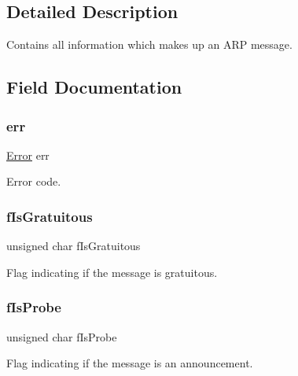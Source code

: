 \subsection{Detailed Description}
Contains all information which makes up an A\+RP message. 

\subsection{Field Documentation}
\mbox{\label{struct_a_r_pmessage___a9078d3b85b5a7c46fc5c80899bd3b6b3}} 
\subsubsection{\texorpdfstring{err}{err}}
{\footnotesize\ttfamily \mbox{\hyperlink{group__error_gada9d6bcf34dabaf048e197cb7b69fa6a}{Error}} err}



Error code. 

\mbox{\label{struct_a_r_pmessage___abf4812a73fd577ace2b9fc876deb3a41}} 
\subsubsection{\texorpdfstring{fIsGratuitous}{fIsGratuitous}}
{\footnotesize\ttfamily unsigned char f\+Is\+Gratuitous}



Flag indicating if the message is gratuitous. 

\mbox{\label{struct_a_r_pmessage___acfb90603349e0df772a79dae542dfa7c}} 
\subsubsection{\texorpdfstring{fIsProbe}{fIsProbe}}
{\footnotesize\ttfamily unsigned char f\+Is\+Probe}



Flag indicating if the message is an announcement. 

\mbox{\label{struct_a_r_pmessage___a02328684750d50e609a16de43cbd46a7}} 
